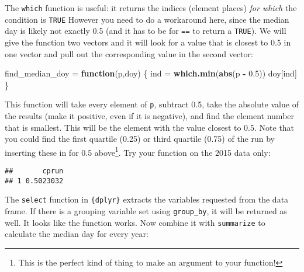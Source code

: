 \documentclass[]{book}
\newenvironment{Shaded}{\begin{snugshade}}{\end{snugshade}}
\newcommand{\KeywordTok}[1]{\textcolor[rgb]{0.13,0.29,0.53}{\textbf{#1}}}
\newcommand{\DataTypeTok}[1]{\textcolor[rgb]{0.13,0.29,0.53}{#1}}
\newcommand{\FloatTok}[1]{\textcolor[rgb]{0.00,0.00,0.81}{#1}}
\newcommand{\StringTok}[1]{\textcolor[rgb]{0.31,0.60,0.02}{#1}}
\newcommand{\CommentTok}[1]{\textcolor[rgb]{0.56,0.35,0.01}{\textit{#1}}}
\newcommand{\ControlFlowTok}[1]{\textcolor[rgb]{0.13,0.29,0.53}{\textbf{#1}}}
\newcommand{\OperatorTok}[1]{\textcolor[rgb]{0.81,0.36,0.00}{\textbf{#1}}}
\newcommand{\NormalTok}[1]{#1}
\let\rmarkdownfootnote\footnote%
\def\footnote{\protect\rmarkdownfootnote}
\theoremstyle{definition}
\theoremstyle{definition}
\theoremstyle{definition}
\theoremstyle{remark}
\begin{document}
The \texttt{which} function is useful: it returns the indices (element
places) \emph{for which} the condition is \texttt{TRUE} However you need
to do a workaround here, since the median day is likely not exactly 0.5
(and it has to be for \texttt{==} to return a \texttt{TRUE}). We will
give the function two vectors and it will look for a value that is
closest to 0.5 in one vector and pull out the corresponding value in the
second vector:

\begin{Shaded}
\begin{Highlighting}[]
\NormalTok{find_median_doy =}\StringTok{ }\ControlFlowTok{function}\NormalTok{(p,doy) \{}
\NormalTok{  ind =}\StringTok{ }\KeywordTok{which.min}\NormalTok{(}\KeywordTok{abs}\NormalTok{(p }\OperatorTok{-}\StringTok{ }\FloatTok{0.5}\NormalTok{))}
\NormalTok{  doy[ind]}
\NormalTok{\}}
\end{Highlighting}
\end{Shaded}

This function will take every element of \texttt{p}, subtract 0.5, take
the absolute value of the results (make it positive, even if it is
negative), and find the element number that is smallest. This will be
the element with the value closest to 0.5. Note that you could find the
first quartile (0.25) or third quartile (0.75) of the run by inserting
these in for 0.5 above\footnote{This is the perfect kind of thing to
  make an argument to your function!}. Try your function on the 2015
data only:

\begin{Shaded}
\end{Shaded}

\begin{verbatim}
##       cprun
## 1 0.5023032
\end{verbatim}

The \texttt{select} function in \texttt{\{dplyr\}} extracts the
variables requested from the data frame. If there is a grouping variable
set using \texttt{group\_by}, it will be returned as well. It looks like
the function works. Now combine it with \texttt{summarize} to calculate
the median day for every year:
\end{document}
